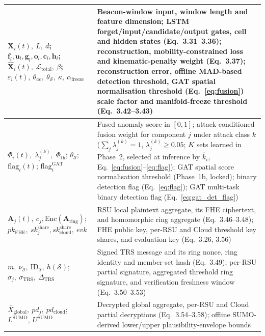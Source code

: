 \documentclass[12pt, a4paper]{report}
\begin{document}
\begin{longtable}{|m{3.6cm}|m{9.0cm}|}
\hline
	$\mathbf{X}_i(t),\ L,\ d$; $\mathbf{f}_l,\mathbf{u}_l,\mathbf{g}_l,\mathbf{o}_l,\mathbf{c}_l,\mathbf{h}_l$; $\hat{\mathbf{X}}_i(t),\ \mathcal{L}_{\text{total}},\ \beta$; $\varepsilon_i(t),\ \theta_{ae},\ \theta_{\mathcal{S}},\ \kappa,\ \alpha_{\text{freeze}}$ & Beacon-window input, window length and feature dimension; LSTM forget/input/candidate/output gates, cell and hidden states (Eq.~3.31--3.36); reconstruction, mobility-constrained loss and kinematic-penalty weight (Eq.~3.37); reconstruction error, offline MAD-based detection threshold, GAT spatial normalisation threshold (Eq.~\ref{eq:fusion}) scale factor and manifold-freeze threshold (Eq.~3.42--3.43) \\
\hline
   $\Phi_i(t),\;
    \lambda_j^{(k)},\;
    \Phi_{\mathrm{th}}$;\;
    $\theta_{\mathcal{S}}$;\;
    $\mathrm{flag}_i(t)$;\;
    $\mathrm{flag}_i^{\mathrm{GAT}}$ &
    Fused anomaly score in $[0,1]$; attack-conditioned fusion weight
    for component $j$ under attack class $k$
    ($\sum_j\lambda_j^{(k)}{=}1$, $\lambda_j^{(k)}{\geq}0.05$;
    $K$ sets learned in Phase~2, selected at inference by
    $\hat{k}_i$, Eq.~\eqref{eq:fusion}--\eqref{eq:flag});
    GAT spatial score normalisation threshold (Phase~1b, locked);
    binary detection flag (Eq.~\eqref{eq:flag});
    GAT multi-task binary detection flag (Eq.~\eqref{eq:gat_det_flag}) \\
\hline
	$\mathbf{A}_j(t),\ c_j,$\newline$\text{Enc}(\mathbf{A}_{\text{ring}})$;\newline$pk_{\text{FHE}},\ sk_j^{\text{share}},$\newline$sk_{\text{cloud}}^{\text{share}},\ evk$ & RSU local plaintext aggregate, its FHE ciphertext, and homomorphic ring aggregate (Eq.~3.46--3.48); FHE public key, per-RSU and Cloud threshold key shares, and evaluation key (Eq.~3.26, 3.56) \\
\hline
	$m,\ \nu_{\mathcal{S}},\ \text{ID}_{\mathcal{S}},\ h(\mathcal{S})$; $\sigma_j,\ \sigma_{\text{TRS}},\ \Delta_{\text{TRS}}$ & Signed TRS message and its ring nonce, ring identity and member-set hash (Eq.~3.49); per-RSU partial signature, aggregated threshold ring signature, and verification freshness window (Eq.~3.50--3.53) \\
\hline
	$\bar{X}_{\text{global}},\ pd_j,\ pd_{\text{cloud}}$; $L^{\text{SUMO}},\ U^{\text{SUMO}}$ & Decrypted global aggregate, per-RSU and Cloud partial decryptions (Eq.~3.54--3.58); offline SUMO-derived lower/upper plausibility-envelope bounds \\

\end{longtable}
\end{document}
